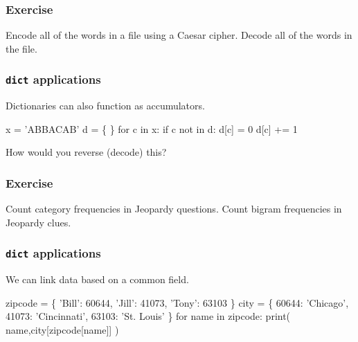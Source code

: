 \documentclass[11pt]{beamer}
\begin{document}
\begin{frame}[fragile]
  \frametitle{Exercise}
  \Enlarge

  \begin{itemize}
  \myitem  Encode all of the words in a file using a Caesar cipher.
  \myitem  Decode all of the words in the file.
  \end{itemize}
\end{frame}

\begin{frame}[fragile]
  \frametitle{\texttt{dict} applications}
  \Enlarge

  \begin{itemize}
  \myitem  Dictionaries can also function as accumulators.
  \end{itemize}
  \begin{semiverbatim}
x = 'ABBACAB'
d = \{ \}
for c in x:
    if c not in d:
        d[c] = 0
        d[c] += 1
  \end{semiverbatim}
  \begin{itemize}
  \myitem  How would you reverse (decode) this?
  \end{itemize}
\end{frame}

\begin{frame}[fragile]
  \frametitle{Exercise}
  \Enlarge

  \begin{itemize}
  \myitem  Count category frequencies in Jeopardy questions.
  \myitem  Count bigram frequencies in Jeopardy clues.
  \end{itemize}
\end{frame}

\begin{frame}[fragile]
  \frametitle{\texttt{dict} applications}
  \Enlarge

  \begin{itemize}
  \myitem  We can link data based on a common field.
  \end{itemize}
  \begin{semiverbatim}
zipcode = \{ 'Bill': 60644,
            'Jill': 41073,
            'Tony': 63103 \}
city = \{ 60644: 'Chicago',
         41073: 'Cincinnati',
         63103: 'St. Louis' \}
for name in zipcode:
    print( name,city[zipcode[name]] )
  \end{semiverbatim}
\end{frame}
\end{document}
